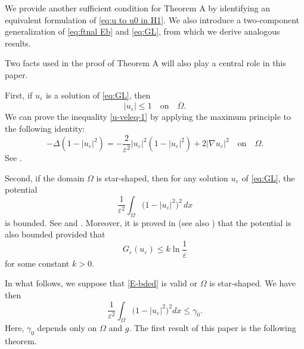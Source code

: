 \documentclass[a4paper,10pt,reqno]{amsart}
\theoremstyle{definition}
\newcommand{\ga}{{\gamma}}
\newcommand{\ve}{{\varepsilon}}
\newcommand{\Om}{{\Omega}}
\newcommand{\qon}{{\quad \mbox{on} \quad}}
\numberwithin{equation}{section}
\begin{document}

We provide another sufficient condition for Theorem A by identifying an equivalent formulation of \eqref{eq:u to u0 in H1}.
We also introduce a two-component generalization of \eqref{eq:ftnal Eb} and \eqref{eq:GL}, from which we derive analogous results.

Two facts used in the proof of Theorem A will also play a central role in this paper.



 First,  if $u_\ve$ is a solution of \eqref{eq:GL}, then
\begin{equation}
\label{u-veleq-1}
 | u_\ve|   \leq 1 \qon \overline{\Om}.
 \end{equation}
  We can prove the inequality  \eqref{u-veleq-1} by applying the maximum principle to the following identity:
 \begin{equation}\label{eq:1-u^2 eqn}
  - \Delta (1- |u_\ve|^2) = - \frac{2}{\ve^2} |u_\ve|^2 (1-|u_\ve |^2) + 2 |\nabla u_\ve|^2 \qon \Om.
\end{equation}
See \cite[Proposition 2]{BBH93}.

Second, if the domain $\Om$ is star-shaped, then for any solution $u_\varepsilon$ of \eqref{eq:GL},  the potential 
\[
\frac{1}{\varepsilon^{2}} \int_\Omega \bigl(1 - |u_\varepsilon|^{2}\bigr)^{2} \, dx 
\]
is bounded.
See \cite[Theorem III.2]{BBH94} and \cite{Str94}.
Moreover,   it is proved in \cite{Lin97} (see also \cite{DelP-F98}) that 
the potential is also bounded  provided that 
\begin{equation}\label{E-bded}
G_\varepsilon(u_\varepsilon) \leq k \ln\frac{1}{\varepsilon}
\end{equation}
for some constant $k>0$. 

In what follows, we suppose that \eqref{E-bded} is valid or $\Om$ is star-shaped. We have then
\begin{equation}\label{potential-bded}
 \frac{1}{\ve^2}  \int_\Om  \big( 1- |u_\ve|^2 \big)^2dx   \le  \ga_0.
 \end{equation}
 Here,   $\ga_0$ depends only on $\Om$ and $g$. 
The first result of this paper is the following theorem.
\end{document}
